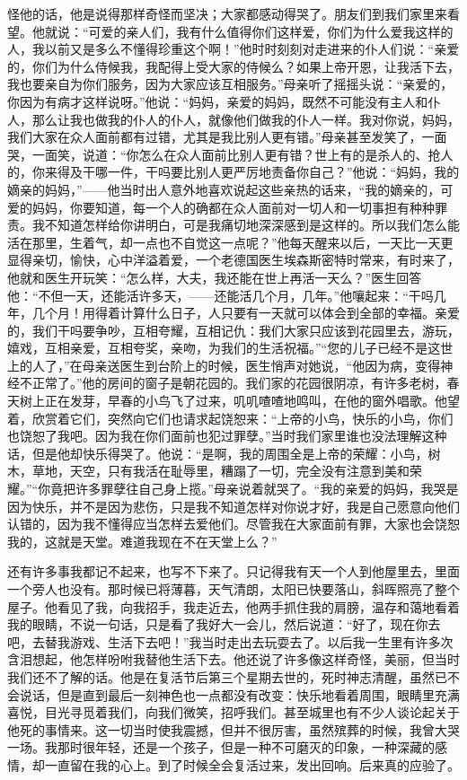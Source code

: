 怪他的话，他是说得那样奇怪而坚决；大家都感动得哭了。朋友们到我们家里来看望。他就说：“可爱的亲人们，我有什么值得你们这样爱，你们为什么爱我这样的人，我以前又是多么不懂得珍重这个啊！”他时时刻刻对走进来的仆人们说：“亲爱的，你们为什么侍候我，我配得上受大家的侍候么？如果上帝开恩，让我活下去，我也要亲自为你们服务，因为大家应该互相服务。”母亲听了摇摇头说：“亲爱的，你因为有病才这样说呀。”他说：“妈妈，亲爱的妈妈，既然不可能没有主人和仆人，那么让我也做我的仆人的仆人，就像他们做我的仆人一样。我对你说，妈妈，我们大家在众人面前都有过错，尤其是我比别人更有错。”母亲甚至发笑了，一面哭，一面笑，说道：“你怎么在众人面前比别人更有错？世上有的是杀人的、抢人的，你来得及干哪一件，干吗要比别人更严厉地责备你自己？”他说：“妈妈，我的嫡亲的妈妈，”——他当时出人意外地喜欢说起这些亲热的话来，“我的嫡亲的，可爱的妈妈，你要知道，每一个人的确都在众人面前对一切人和一切事担有种种罪责。我不知道怎样给你讲明白，可是我痛切地深深感到是这样的。所以我们怎么能活在那里，生着气，却一点也不自觉这一点呢？”他每天醒来以后，一天比一天更显得亲切，愉快，心中洋溢着爱，一个老德国医生埃森斯密特时常来，有时来了，他就和医生开玩笑：“怎么样，大夫，我还能在世上再活一天么？”医生回答他：“不但一天，还能活许多天，——还能活几个月，几年。”他嚷起来：“干吗几年，几个月！用得着计算什么日子，人只要有一天就可以体会到全部的幸福。亲爱的，我们干吗要争吵，互相夸耀，互相记仇：我们大家只应该到花园里去，游玩，嬉戏，互相亲爱，互相夸奖，亲吻，为我们的生活祝福。”“您的儿子已经不是这世上的人了，”在母亲送医生到台阶上的时候，医生悄声对她说，“他因为病，变得神经不正常了。”他的房间的窗子是朝花园的。我们家的花园很阴凉，有许多老树，春天树上正在发芽，早春的小鸟飞了过来，叽叽喳喳地鸣叫，在他的窗外唱歌。他望着，欣赏着它们，突然向它们也请求起饶恕来：“上帝的小鸟，快乐的小鸟，你们也饶恕了我吧。因为我在你们面前也犯过罪孽。”当时我们家里谁也没法理解这种话，但是他却快乐得哭了。他说：“是啊，我的周围全是上帝的荣耀：小鸟，树木，草地，天空，只有我活在耻辱里，糟蹋了一切，完全没有注意到美和荣耀。”“你竟把许多罪孽往自己身上揽。”母亲说着就哭了。“我的亲爱的妈妈，我哭是因为快乐，并不是因为悲伤，只是我不知道怎样对你说才好，我是自己愿意向他们认错的，因为我不懂得应当怎样去爱他们。尽管我在大家面前有罪，大家也会饶恕我的，这就是天堂。难道我现在不在天堂上么？”
\par 还有许多事我都记不起来，也写不下来了。只记得我有天一个人到他屋里去，里面一个旁人也没有。那时候已将薄暮，天气清朗，太阳已快要落山，斜晖照亮了整个屋子。他看见了我，向我招手，我走近去，他两手抓住我的肩膀，温存和蔼地看着我的眼睛，不说一句话，只是看了我好大一会儿，然后说道：“好了，现在你去吧，去替我游戏、生活下去吧！”我当时走出去玩耍去了。以后我一生里有许多次含泪想起，他怎样吩咐我替他生活下去。他还说了许多像这样奇怪，美丽，但当时我们还不了解的话。他是在复活节后第三个星期去世的，死时神志清醒，虽然已不会说话，但是直到最后一刻神色也一点都没有改变：快乐地看着周围，眼睛里充满喜悦，目光寻觅着我们，向我们微笑，招呼我们。甚至城里也有不少人谈论起关于他死的事情来。这一切当时使我震撼，但并不很厉害，虽然殡葬的时候，我曾大哭一场。我那时很年轻，还是一个孩子，但是一种不可磨灭的印象，一种深藏的感情，却一直留在我的心上。到了时候全会复活过来，发出回响。后来真的应验了。

